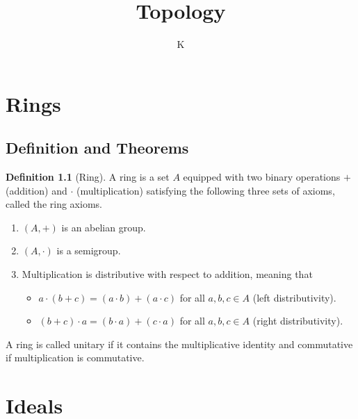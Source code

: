 \documentclass[a4paper]{book}
\title{Topology}
\author{K}
\theoremstyle{definition}
\newtheorem{definition}{Definition}[]
\begin{document}
\maketitle
\tableofcontents
\chapter{Rings}
\section{Definition and Theorems}
\begin{defbox}
    \begin{definition}[Ring]
        A ring is a set \(A\) equipped with two binary operations \(+\) (addition) and \(\cdot\) (multiplication) satisfying the following three sets of axioms, called the ring axioms.
    \begin{enumerate}
      \item \((A, +)\) is an abelian group.
      \item \((A, \cdot)\) is a semigroup.
      \item Multiplication is distributive with respect to addition, meaning that
      \begin{itemize}
        \item \(a \cdot (b + c) = (a \cdot b) + (a \cdot c)\) for all \(a, b, c \in A\) (left distributivity).
        \item \((b + c) \cdot a = (b \cdot a) + (c \cdot a)\) for all \(a, b, c \in A\) (right distributivity).
      \end{itemize}
    \end{enumerate}
    A ring is called unitary if it contains the multiplicative identity and commutative if multiplication is commutative.
    \end{definition}
\end{defbox}

\chapter{Ideals}
\end{document}
